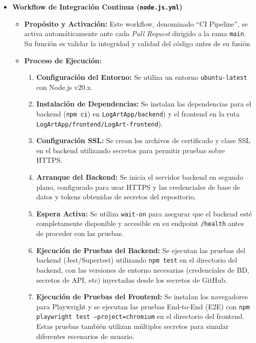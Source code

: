     \begin{itemize}
        \item \textbf{Workflow de Integración Continua (\texttt{node.js.yml})}
            \begin{itemize}
                \item \textbf{Propósito y Activación:} Este workflow, denominado ``CI Pipeline'', se activa automáticamente ante cada \textit{Pull Request} dirigido a la rama \texttt{main}. Su función es validar la integridad y calidad del código antes de su fusión
                \item \textbf{Proceso de Ejecución:}
                    \begin{enumerate}
                        \item \textbf{Configuración del Entorno:} Se utiliza un entorno \texttt{ubuntu-latest} con Node.js v20.x.
                        \item \textbf{Instalación de Dependencias:} Se instalan las dependencias para el backend (\texttt{npm ci}) en \texttt{LogArtApp/backend}) y el frontend en la ruta \texttt{LogArtApp/frontend/LogArt-frontend}).
                        \item \textbf{Configuración SSL:} Se crean los archivos de certificado y clase SSL en el backend utilizando secretos para permitir pruebas sobre HTTPS.
                        \item \textbf{Arranque del Backend:} Se inicia el servidor backend en segundo plano, configurado para usar HTTPS y las credenciales de base de datos y tokens obtenidas de secretos del repositorio.
                        \item \textbf{Espera Activa:} Se utiliza \texttt{wait-on} para asegurar que el backend esté completamente disponible y accesible en su endpoint \texttt{/health} antes de proceder con las pruebas.
                        \item \textbf{Ejecución de Pruebas del Backend:} Se ejecutan las pruebas del backend (Jest/Supertest) utilizando \texttt{npm test} en el directorio del backend, con las versiones de entorno necesarias (credenciales de BD, secretos de API, etc) inyectadas desde los secretos de GitHub.
                        \item \textbf{Ejecución de Pruebas del Frontend:} Se instalan los navegadores para Playwright y se ejecutan las pruebas End-to-End (E2E) con \texttt{npm playwright test --project=chromium} en el directorio del frontend. Estas pruebas también utilizan múltiples secretos para simular diferentes escenarios de usuario.

\end{enumerate}
\end{itemize}
\end{itemize}
